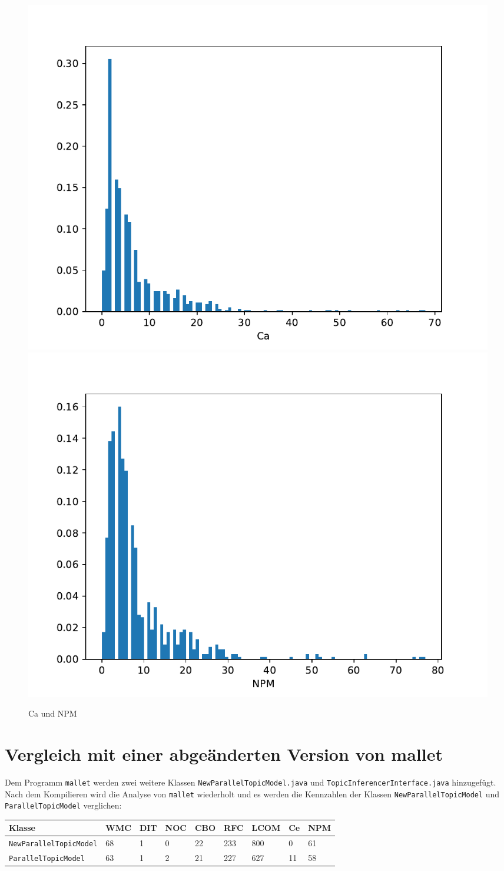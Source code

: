 \documentclass{scrreprt}
\newcommand{\lstx}[1]{\lstinline$#1$}
\begin{document}

\begin{figure}
 \includegraphics[width=.45\textwidth]{./Ca.pdf}
  \includegraphics[width=.45\textwidth]{./NPM.pdf}
 \caption{Ca und NPM}
 \label{abb:ca_npm}
\end{figure}

\section{Vergleich mit einer abgeänderten Version von mallet}

Dem Programm \lstx{mallet} werden zwei weitere Klassen \lstx{NewParallelTopicModel.java} und \lstx{TopicInferencerInterface.java} hinzugefügt. Nach dem Kompilieren wird die Analyse von \lstx{mallet} wiederholt und es werden die Kennzahlen der Klassen \lstx{NewParallelTopicModel} und \lstx{ParallelTopicModel} verglichen:


\begin{tabular}{lllllllll}
\toprule
Klasse & WMC & DIT & NOC & CBO & RFC & LCOM & Ce & NPM \\
\midrule
\lstx{NewParallelTopicModel} & 68 & 1 & 0 & 22 & 233 & 800 & 0 & 61 \\
\lstx{ParallelTopicModel} & 63 & 1 & 2 & 21 & 227 & 627 & 11 & 58 \\
\bottomrule
\end{tabular}
\end{document}
